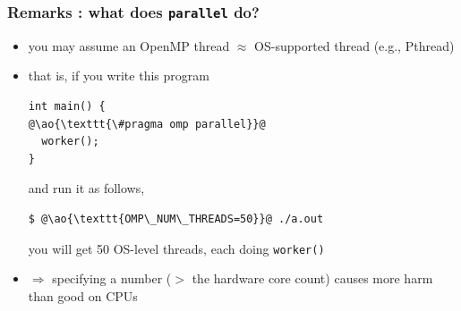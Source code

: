 \documentclass[12pt,dvipdfmx]{beamer}
\newcommand{\ao}[1]{{\color{blue}#1}}
\begin{document}

\begin{frame}[fragile]
\frametitle{Remarks : what does \texttt{parallel} do?}
\begin{itemize}
\item you may assume an OpenMP thread $\approx$ OS-supported 
  thread (e.g., Pthread)

\item that is, if you write this program
\begin{lstlisting}
int main() {
@\ao{\texttt{\#pragma omp parallel}}@
  worker();
}
\end{lstlisting}
and run it as follows,
\begin{lstlisting}
$ @\ao{\texttt{OMP\_NUM\_THREADS=50}}@ ./a.out
\end{lstlisting} %
you will get 50 OS-level threads, each doing {\tt worker()}

\item $\Rightarrow$ specifying a number ($>$ the hardware
  core count) causes more harm than good on CPUs
\end{itemize}
\end{frame}
\end{document}

